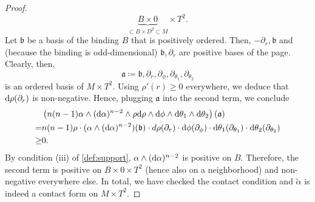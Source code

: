 \begin{proof}
    \[
        \underbrace{B \times 0}_{\subset B \times D^2 \subset M} \times T^2.
    \]
    Let $\mathfrak{b}$ be a basis of the binding $B$ that is positively ordered. Then, $- \partial_r, \mathfrak{b}$ and (because the binding is odd-dimensional) $\mathfrak{b}, \partial_r$ are positive bases of the page. Clearly, then, 
    \[ 
        \mathfrak{a} \coloneqq \mathfrak{b}, \partial_r, \partial_\phi, \partial_{\theta_1}, \partial_{\theta_2}
    \] 
    is an ordered basis of $M\times T^2$.
    Using $\rho'(r) \geq 0$ everywhere, we deduce that $\mathrm{d} \rho(\partial_r)$ is non-negative.
    Hence, plugging $\mathfrak{a}$ into the second term, we conclude
    \begin{align*}
        &\left(n(n-1)\alpha \wedge (\mathrm{d} \alpha)^{n-2}\wedge \rho \mathrm{d}\rho \wedge \mathrm{d} \phi \wedge \mathrm{d} \theta_1 \wedge \mathrm{d} \theta_2\right)(\mathfrak{a})\\
        =& n(n-1) \rho \cdot (\alpha \wedge (\mathrm{d} \alpha)^{n-2})(\mathfrak{b}) \cdot d\rho(\partial_r) \cdot \mathrm{d} \phi(\partial_\phi) \cdot \mathrm{d} \theta_1(\partial_{\theta_1}) \cdot \mathrm{d} \theta_2(\partial_{\theta_2})\\
        \geq& 0.
    \end{align*}
    By condition (iii) of \cref{def:support}, $\alpha \wedge (\mathrm{d} \alpha)^{n-2}$ is positive on $B$. Therefore, the second term is positive on $B \times 0 \times T^2$ (hence also on a neighborhood) and non-negative everywhere else.
    In total, we have checked the contact condition and $\tilde \alpha$ is indeed a contact form on $M\times T^2$.
\end{proof}
